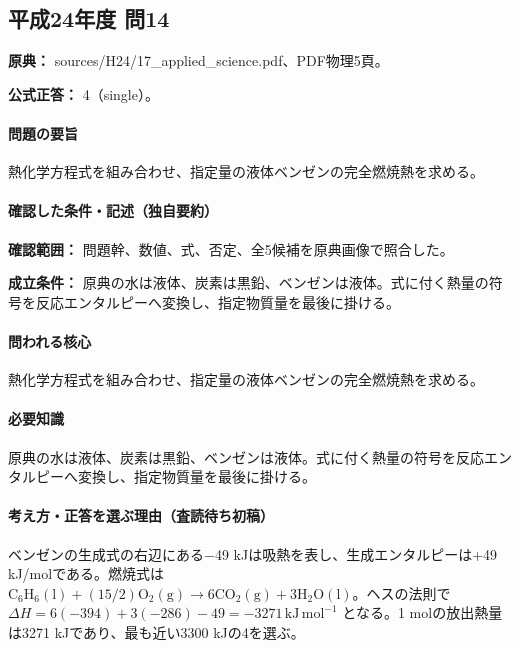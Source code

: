 \subsection{平成24年度 問14}
\label{q:h24-reg-applied-14}

\noindent\textbf{原典：} sources/H24/17\_applied\_science.pdf、PDF物理5頁。

\textbf{公式正答：} 4（single）。

\paragraph{問題の要旨} 熱化学方程式を組み合わせ、指定量の液体ベンゼンの完全燃焼熱を求める。

\paragraph{確認した条件・記述（独自要約）}\mbox{}\par

\noindent\textbf{確認範囲：} 問題幹、数値、式、否定、全5候補を原典画像で照合した。\par

\noindent\textbf{成立条件：} 原典の水は液体、炭素は黒鉛、ベンゼンは液体。式に付く熱量の符号を反応エンタルピーへ変換し、指定物質量を最後に掛ける。\par

\paragraph{問われる核心} 熱化学方程式を組み合わせ、指定量の液体ベンゼンの完全燃焼熱を求める。

\paragraph{必要知識} 原典の水は液体、炭素は黒鉛、ベンゼンは液体。式に付く熱量の符号を反応エンタルピーへ変換し、指定物質量を最後に掛ける。

\paragraph{考え方・正答を選ぶ理由（査読待ち初稿）} ベンゼンの生成式の右辺にある−49 kJは吸熱を表し、生成エンタルピーは+49 kJ/molである。燃焼式は \(\mathrm{C_6H_6(l)}+(15/2)\mathrm{O_2(g)}\to6\mathrm{CO_2(g)}+3\mathrm{H_2O(l)}\)。ヘスの法則で \(\Delta H=6(-394)+3(-286)-49=-3271\,\mathrm{kJ\,mol^{-1}}\) となる。1 molの放出熱量は3271 kJであり、最も近い3300 kJの4を選ぶ。

